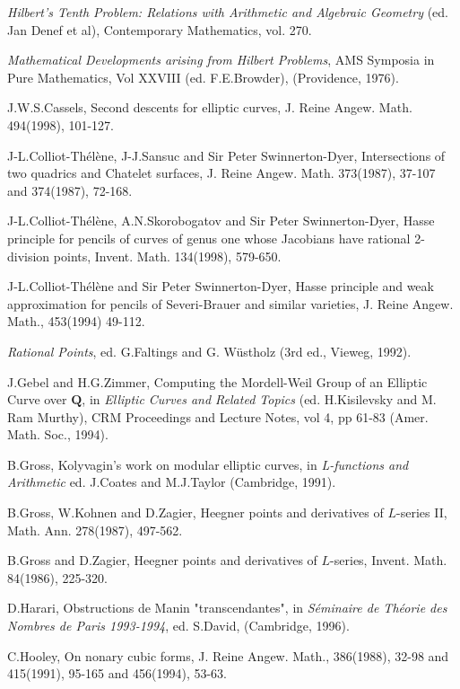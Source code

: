 \documentclass[12pt]{article}
\def\bQ{{\mathbf Q}}
\begin{document}
\noindent [9] \textit{Hilbert's Tenth Problem: Relations with Arithmetic and
Algebraic Geometry} (ed. Jan Denef et al), Contemporary Mathematics, vol. 270.

\noindent [10] \textit{Mathematical Developments arising from Hilbert
Problems}, AMS Symposia in Pure Mathematics, Vol XXVIII (ed. F.E.Browder),
(Providence, 1976).

\noindent [11] J.W.S.Cassels, Second descents for elliptic curves, J. Reine
Angew. Math. 494(1998), 101-127.

\noindent [12] J-L.Colliot-Th\'{e}l\`{e}ne, J-J.Sansuc and Sir Peter
Swinnerton-Dyer, Intersections of two quadrics and Chatelet surfaces,
J. Reine Angew. Math. 373(1987), 37-107 and 374(1987), 72-168.

\noindent [13] J-L.Colliot-Th\'{e}l\`{e}ne, A.N.Skorobogatov and Sir Peter
Swinnerton-Dyer, Hasse principle for pencils of curves of genus one whose
Jacobians have rational 2-division points, Invent. Math. 134(1998),
579-650.

\noindent [14] J-L.Colliot-Th\'{e}l\`{e}ne and Sir Peter Swinnerton-Dyer,
Hasse principle and weak approximation for pencils of Severi-Brauer and
similar varieties, J. Reine Angew. Math., 453(1994) 49-112.

\noindent [15] \textit{Rational Points}, ed. G.Faltings and G. W\"{u}stholz
(3rd ed., Vieweg, 1992).

\noindent [16] J.Gebel and H.G.Zimmer, Computing the Mordell-Weil Group of
an Elliptic Curve over $\bQ$, in \textit{Elliptic Curves and Related Topics}
(ed. H.Kisilevsky and M. Ram Murthy), CRM Proceedings and Lecture Notes, vol 4,
pp 61-83 (Amer. Math. Soc., 1994).

\noindent [17] B.Gross, Kolyvagin's work on modular elliptic curves, in
\textit{L-functions and Arithmetic} ed. J.Coates and M.J.Taylor (Cambridge,
1991).

\noindent [18] B.Gross, W.Kohnen and D.Zagier, Heegner points and derivatives
of $L$-series II, Math. Ann. 278(1987), 497-562.

\noindent [19] B.Gross and D.Zagier, Heegner points and derivatives of
$L$-series, Invent. Math. 84(1986), 225-320.

\noindent [20] D.Harari, Obstructions de Manin "transcendantes",
in \textit{S\'{e}minaire de Th\'{e}orie des Nombres de Paris 1993-1994},
ed. S.David, (Cambridge, 1996).

\noindent [21] C.Hooley, On nonary cubic forms, J. Reine Angew. Math.,
386(1988), 32-98 and 415(1991), 95-165 and 456(1994), 53-63.
\end{document}
